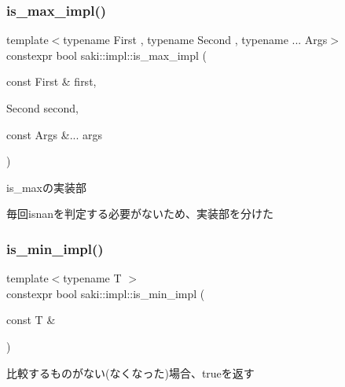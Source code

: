\subsubsection{\texorpdfstring{is\+\_\+max\+\_\+impl()}{is\_max\_impl()}\hspace{0.1cm}{\footnotesize\ttfamily [2/2]}}
{\footnotesize\ttfamily template$<$typename First , typename Second , typename ... Args$>$ \\
constexpr bool saki\+::impl\+::is\+\_\+max\+\_\+impl (\begin{DoxyParamCaption}\item[{const First \&}]{first,  }\item[{Second}]{second,  }\item[{const Args \&...}]{args }\end{DoxyParamCaption})}



is\+\_\+maxの実装部 

毎回isnanを判定する必要がないため、実装部を分けた \mbox{\label{namespacesaki_1_1impl_ac84f4d7f2170d7090fc5e9fb79c21b7f}} 
\subsubsection{\texorpdfstring{is\+\_\+min\+\_\+impl()}{is\_min\_impl()}\hspace{0.1cm}{\footnotesize\ttfamily [1/2]}}
{\footnotesize\ttfamily template$<$typename T $>$ \\
constexpr bool saki\+::impl\+::is\+\_\+min\+\_\+impl (\begin{DoxyParamCaption}\item[{const T \&}]{ }\end{DoxyParamCaption})}



比較するものがない(なくなった)場合、trueを返す 

\mbox{\label{namespacesaki_1_1impl_a97640b18d57a2a6ea4746acc3cd62bbb}} 
